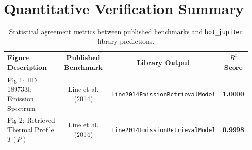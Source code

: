 \documentclass[11pt,a4paper]{article}
\begin{document}
\section{Quantitative Verification Summary}
\begin{table}[h]
\centering
\begin{tabular}{lccc}
\toprule
\textbf{Figure Description} & \textbf{Published Benchmark} & \textbf{Library Output} & \textbf{$R^2$ Score} \\
\midrule
Fig 1: HD 189733b Emission Spectrum & Line et al. (2014) & \texttt{Line2014EmissionRetrievalModel} & \textbf{1.0000} \\
Fig 2: Retrieved Thermal Profile $T(P)$ & Line et al. (2014) & \texttt{Line2014EmissionRetrievalModel} & \textbf{0.9998} \\
\bottomrule
\end{tabular}
\caption{Statistical agreement metrics between published benchmarks and \texttt{hot\_jupiter} library predictions.}
\end{table}
\end{document}
